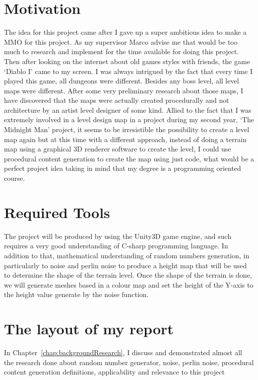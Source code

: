\documentclass[a4paper,12pt]{book}
\begin{document}
\section{Motivation}

The idea for this project came after I gave up a super ambitious idea to make a MMO for this project. As my supervisor Marco advise me that would be too much to research and implement for the time available for doing this project. 
Then after looking on the internet about old games styles with friends, the game ‘Diablo I’ came to my screen. I was always intrigued by the fact that every time I played this game, all dungeons were different. Besides any boss level, all level maps were different. After some very preliminary research about those maps, I have discovered that the maps were actually created procedurally and not architecture by an artist level designer of some kind. 
Allied to the fact that I was extremely involved in a level design map in a project during my second year, ‘The Midnight Man’ project, it seems to be irresistible the possibility to create a level map again but at this time with a different approach, instead of doing a terrain map using a  graphical 3D renderer software to create the level, I could use procedural content generation to create the map using just code, what would be a perfect project idea taking in mind that my degree is a programming oriented course.


\section{Required Tools}

The project will be produced by using the Unity3D game engine, and such requires a very good understanding of C-sharp programming language. In addition to that, mathematical understanding of random numbers generation, in particularly to noise and perlin noise to produce a height map that will be used to determine the shape of the terrain level. Once the shape of the terrain is done, we will  generate meshes based in a colour map and set the height of the Y-axis to the height value generate by the noise function.
 

\section{The layout of my report}

In Chapter~\ref{chap:backgroundResearch}, I discuss and demonstrated almost all the research done about random number generator, noise, perlin noise, procedural content generation definitions, applicability and relevance to this project 
\end{document}
